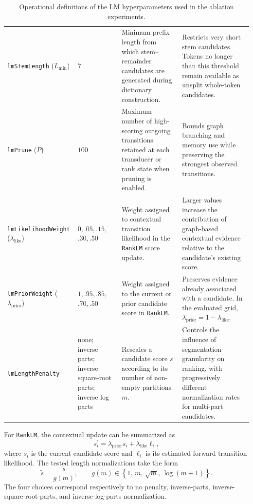 \begin{table}[t]
\begin{tabular}{
    p{}
    p{}
    p{}
    p{}
  }
    \texttt{lmStemLength} ($L_{\min}$)
    & $7$
    & Minimum prefix length from which stem--remainder candidates are
      generated during dictionary construction.
    & Restricts very short stem candidates. Tokens no longer than this
      threshold remain available as unsplit whole-token candidates.
      \\

    \texttt{lmPrune} ($P$)
    & $100$
    & Maximum number of high-scoring outgoing transitions retained at each
      transducer or rank state when pruning is enabled.
    & Bounds graph branching and memory use while preserving the strongest
      observed transitions.
      \\

    \texttt{lmLikelihoodWeight} ($\lambda_{\mathrm{like}}$)
    & $0,.05,.15,$\newline $.30,.50$
    & Weight assigned to contextual transition likelihood in the
      \texttt{RankLM} score update.
    & Larger values increase the contribution of graph-based contextual
      evidence relative to the candidate's existing score.
      \\

    \texttt{lmPriorWeight} ($\lambda_{\mathrm{prior}}$)
    & $1,.95,.85,$\newline $.70,.50$
    & Weight assigned to the current or prior candidate score in
      \texttt{RankLM}.
    & Preserves evidence already associated with a candidate. In the
      evaluated grid,
      $\lambda_{\mathrm{prior}}=1-\lambda_{\mathrm{like}}$.
      \\

    \texttt{lmLengthPenalty}
    & none; inverse parts; inverse square-root parts; inverse log parts
    & Rescales a candidate score $s$ according to its number of non-empty
      partitions $m$.
    & Controls the influence of segmentation granularity on ranking, with
      progressively different normalization rates for multi-part candidates.
      \\
    \hline
  \end{tabular}
  \caption{Operational definitions of the LM hyperparameters used in the
  ablation experiments.}
  \label{tab:hyperparameters}
\end{table}

For \texttt{RankLM}, the contextual update can be summarized as
\begin{equation}
  s_i^{\prime}
  =
  \lambda_{\mathrm{prior}}s_i
  +
  \lambda_{\mathrm{like}}\ell_i,
\end{equation}
where $s_i$ is the current candidate score and $\ell_i$ is its estimated
forward-transition likelihood. The tested length normalizations take the
form
\begin{equation}
  \widetilde{s}
  =
  \frac{s}{g(m)},
  \qquad
  g(m)\in
  \left\{
    1,\,
    m,\,
    \sqrt{m},\,
    \log(m+1)
  \right\}.
\end{equation}
The four choices correspond respectively to no penalty, inverse-parts,
inverse-square-root-parts, and inverse-log-parts normalization.

